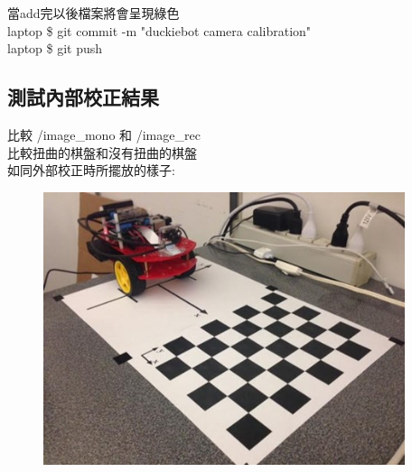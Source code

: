 \documentclass{article}
\begin{document}
當add完以後檔案將會呈現綠色
\\laptop \$ git commit -m "duckiebot camera calibration"
\\laptop \$ git push

\subsection{測試內部校正結果}

比較 /image\_mono 和 /image\_rec
\\比較扭曲的棋盤和沒有扭曲的棋盤
\\如同外部校正時所擺放的樣子:

\begin{figure}[htp]
    \begin{center}
        \includegraphics[width=300pt]{pic/圖片19.jpg}
    \end{center}
\end{figure}
\end{document}
